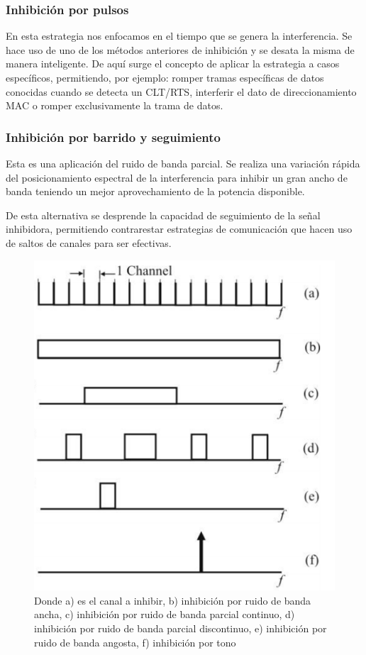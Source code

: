 \subsubsection{Inhibición por pulsos}

En esta estrategia nos enfocamos en el tiempo que se genera la interferencia. Se hace uso de uno de los métodos anteriores de inhibición
y se desata la misma de manera inteligente. De aquí surge el concepto de aplicar la estrategia a casos específicos, permitiendo, por ejemplo:
romper tramas específicas de datos conocidas cuando se detecta un CLT/RTS, interferir el dato de direccionamiento MAC o romper exclusivamente
la trama de datos.

\subsubsection{Inhibición por barrido y seguimiento}

Esta es una aplicación del ruido de banda parcial. Se realiza una variación rápida del posicionamiento espectral de la interferencia para inhibir
un gran ancho de banda teniendo un mejor aprovechamiento de la potencia disponible.\par
De esta alternativa se desprende la capacidad de seguimiento de la señal inhibidora, permitiendo contrarestar estrategias de comunicación que 
hacen uso de saltos de canales para ser efectivas.

\begin{figure}[htb]
	\centering
	\includegraphics[scale=0.65]{images/tipos_de_jam.png}
    \caption{Donde a) es el canal a inhibir, b) inhibición por ruido de banda ancha, c) inhibición por ruido de banda parcial continuo, 
    d) inhibición por ruido de banda parcial discontinuo, e) inhibición por ruido de banda angosta, f) inhibición por tono }
	\label{tipos_de_jam}
\end{figure}


